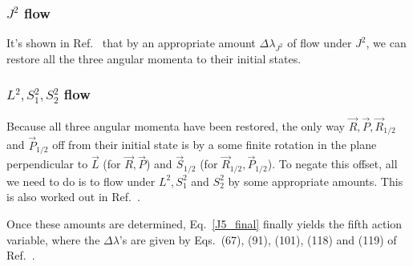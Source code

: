 \subsubsection{$J^2$ flow}

It's shown in Ref.~\cite{tanay2021action} that by an appropriate amount
$\Delta \lambda_{J^2}$ of flow under $J^2$, we can restore all the three angular momenta to their initial states.


\subsubsection{$L^2, S_1^2, S_2^2$ flow}

Because all three angular momenta have been restored, the only
way $\vec{R}, \vec{P}, \vec{R}_{1/2}$ and $\vec{P}_{1/2}$ off from their 
initial state is by a some finite rotation in the plane perpendicular
to $\vec{L}$ (for $\vec{R}, \vec{P}$) 
and $\vec{S}_{1/2}$ (for $\vec{R}_{1/2}, \vec{P}_{1/2}$). To negate this offset,
all we need to do is to flow under $L^2, S_1^2$ and $S_2^2$ by some
appropriate amounts. This is also worked out in Ref.~\cite{tanay2021action}.






Once these amounts are determined, Eq.~\ref{J5_final}
finally yields the fifth action variable, where the $\Delta \lambda$'s are 
given by Eqs.~(67), (91), (101), (118) and (119) of Ref.~\cite{tanay2021action}.





















